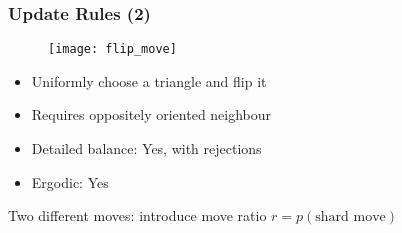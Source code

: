 \begin{frame}
    \frametitle{Update Rules (2)}
    \begin{figure}
        \centering
        \texttt{[image: flip\_move]}
    \end{figure}
    \begin{itemize}
        \item Uniformly choose a triangle and flip it
        \item Requires oppositely oriented neighbour
        \item Detailed balance: Yes, with rejections
        \item Ergodic: Yes
    \end{itemize}
    Two different moves: introduce move ratio $r = p(\text{shard move})$
\end{frame}